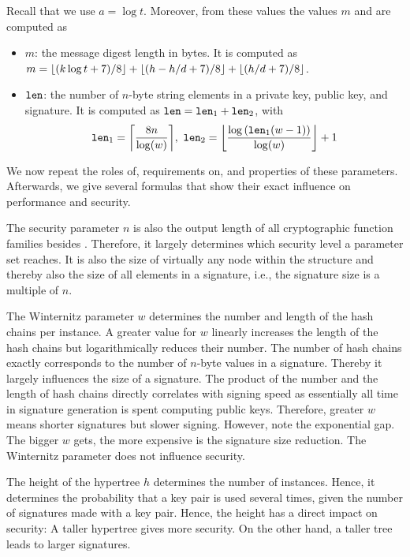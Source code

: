 Recall that 
we use $a = \log t$. Moreover, from these values the values $m$ and \len are
computed as
\begin{itemize}
  \item $m$: the message digest length in bytes. 
  It is computed as $m = \lfloor(k\log t +7)/ 8\rfloor + \lfloor(h - h/d +7)/ 8\rfloor + \lfloor(h / d +7)/ 8\rfloor$.
  \item $\texttt{len}$: the number of $n$-byte string elements in a \wotsp private
        key, public key, and signature. It is computed as $\texttt{len} =
        \texttt{len}_1 + \texttt{len}_2$, with
        \begin{equation*}
          \len_1 = \ceil*{\frac{8n}{\log(w)}},\
          \len_2 = \floor*{\frac{\log{(\len_1(w - 1))}}{\log(w)}} + 1
        \end{equation*}
\end{itemize}

We now repeat the roles of, requirements on, and properties of these parameters.
Afterwards, we give several formulas that show their exact influence on 
performance and security.

The security parameter $n$ is also the output length of all cryptographic function 
families besides \sphincsHmsg. Therefore, it largely determines which security 
level a parameter set reaches. It is also the size of virtually any node 
within the \spx structure and thereby also the size of all elements in a 
signature, i.e., the signature size is a multiple of $n$. 

The Winternitz parameter $w$ determines the number and length of the hash chains per 
\wotsp instance. A greater value for $w$ linearly increases the length of the 
hash chains but logarithmically reduces their number. The number of hash 
chains exactly corresponds to the number of $n$-byte values in a \wotsp 
signature. Thereby it largely influences the size of a \spx signature. 
The product of the number and the length of hash chains directly correlates with 
signing speed as essentially all time in \hyper signature generation is spent 
computing \wotsp public keys. Therefore, greater $w$ means shorter signatures 
but slower signing. However, note the exponential gap. The bigger $w$ gets, 
the more expensive is the signature size reduction. The Winternitz parameter 
does not influence \spx security.

The height of the hypertree $h$ determines the number of \fors instances. Hence,
it determines the probability that a \fors key pair is used several times, 
given the number of signatures made with a \spx key pair. Hence, the height has 
a direct impact on security: A taller hypertree gives more security. On the 
other hand, a taller tree leads to larger signatures.

